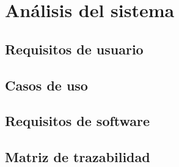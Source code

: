 \chapter{Análisis del sistema}
\label{ch:analisis}
\section{Requisitos de usuario}

\section{Casos de uso}

\section{Requisitos de software}

\section{Matriz de trazabilidad}